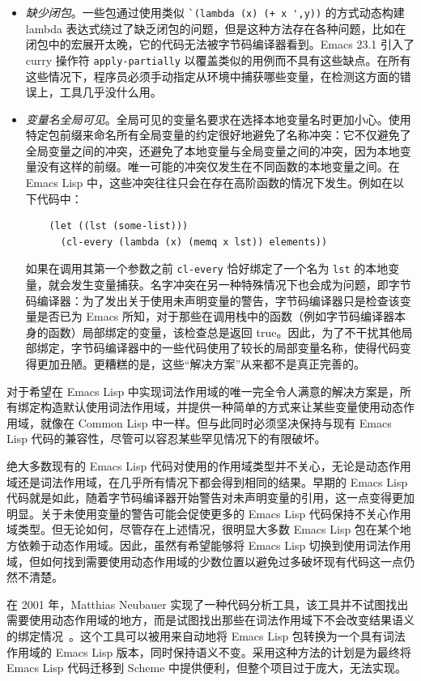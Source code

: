 \documentclass[format=acmsmall,screen]{acmart}
\begin{document}
\begin{itemize}
\item \textit{缺少闭包}。一些包通过使用类似 \verb|`(lambda (x) (+ x ',y))| 的方式动态构建 lambda 表达式绕过了缺乏闭包的问题，但是这种方法存在各种问题，比如在闭包中的宏展开太晚，它的代码无法被字节码编译器看到。Emacs 23.1 引入了 curry 操作符 \texttt{apply-partially} 以覆盖类似的用例而不具有这些缺点。在所有这些情况下，程序员必须手动指定从环境中捕获哪些变量，在检测这方面的错误上，工具几乎没什么用。

\item \textit{变量名全局可见}。全局可见的变量名要求在选择本地变量名时更加小心。使用特定包前缀来命名所有全局变量的约定很好地避免了名称冲突：它不仅避免了全局变量之间的冲突，还避免了本地变量与全局变量之间的冲突，因为本地变量没有这样的前缀。唯一可能的冲突仅发生在不同函数的本地变量之间。在 Emacs Lisp 中，这些冲突往往只会在存在高阶函数的情况下发生。例如在以下代码中：
\begin{verbatim}
    (let ((lst (some-list)))
      (cl-every (lambda (x) (memq x lst)) elements))
\end{verbatim}
如果在调用其第一个参数之前 \texttt{cl-every} 恰好绑定了一个名为 \texttt{lst} 的本地变量，就会发生变量捕获。名字冲突在另一种特殊情况下也会成为问题，即字节码编译器：为了发出关于使用未声明变量的警告，字节码编译器只是检查该变量是否已为 Emacs 所知，对于那些在调用栈中的函数（例如字节码编译器本身的函数）局部绑定的变量，该检查总是返回 true。因此，为了不干扰其他局部绑定，字节码编译器中的一些代码使用了较长的局部变量名称，使得代码变得更加丑陋。更糟糕的是，这些“解决方案”从来都不是真正完善的。
\end{itemize}

对于希望在 Emacs Lisp 中实现词法作用域的唯一完全令人满意的解决方案是，所有绑定构造默认使用词法作用域，并提供一种简单的方式来让某些变量使用动态作用域，就像在 Common Lisp 中一样。但与此同时必须坚决保持与现有 Emacs Lisp 代码的兼容性，尽管可以容忍某些罕见情况下的有限破坏。

绝大多数现有的 Emacs Lisp 代码对使用的作用域类型并不关心，无论是动态作用域还是词法作用域，在几乎所有情况下都会得到相同的结果。早期的 Emacs Lisp 代码就是如此，随着字节码编译器开始警告对未声明变量的引用，这一点变得更加明显。关于未使用变量的警告可能会促使更多的 Emacs Lisp 代码保持不关心作用域类型。但无论如何，尽管存在上述情况，很明显大多数 Emacs Lisp 包在某个地方依赖于动态作用域。因此，虽然有希望能够将 Emacs Lisp 切换到使用词法作用域，但如何找到需要使用动态作用域的少数位置以避免过多破坏现有代码这一点仍然不清楚。

在 2001 年，Matthias Neubauer 实现了一种代码分析工具，该工具并不试图找出需要使用动态作用域的地方，而是试图找出那些在词法作用域下不会改变结果语义的绑定情况~\cite{Neubauer01}。这个工具可以被用来自动地将 Emacs Lisp 包转换为一个具有词法作用域的 Emacs Lisp 版本，同时保持语义不变。采用这种方法的计划是为最终将 Emacs Lisp 代码迁移到 Scheme 中提供便利，但整个项目过于庞大，无法实现。
\end{document}
